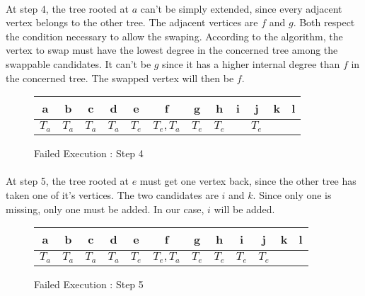 \paragraph{}
At step 4, the tree rooted at $a$ can't be simply extended, since every
adjacent vertex belongs to the other tree. The adjacent vertices are $f$ and
$g$. Both respect the condition necessary to allow the swaping. According to
the algorithm, the vertex to swap must have the lowest degree in the concerned
tree among the swappable candidates. It can't be $g$ since it has a higher
internal degree than $f$ in the concerned tree. The swapped vertex will then be
$f$.

\begin{figure}[H]
  \caption{Failed Execution : Step 4}
  \begin{center}
    \begin{tikzpicture}[scale=0.9,transform shape]
      
    \end{tikzpicture}
    \begin{tabular}{|c|c|c|c|c|c|c|c|c|c|c|c|}
\hline
a & b & c & d & e & f & g & h & i & j & k & l\\
\hline
$T_a$ & $T_a$ & $T_a$ & $T_a$ & $T_e$ & $T_e, T_a$ & $T_e$ & $T_e$ & & $T_e$ & &\\
\hline
    \end{tabular}
  \end{center}
\end{figure}

\paragraph{}
At step 5, the tree rooted at $e$ must get one vertex back, since the other
tree has taken one of it's vertices. The two candidates are $i$ and $k$. Since
only one is missing, only one must be added. In our case, $i$ will be added.

\begin{figure}[H]
  \caption{Failed Execution : Step 5}
  \begin{center}
    \begin{tikzpicture}[scale=0.9,transform shape]
      
    \end{tikzpicture}
    \begin{tabular}{|c|c|c|c|c|c|c|c|c|c|c|c|}
\hline
a & b & c & d & e & f & g & h & i & j & k & l\\
\hline
$T_a$ & $T_a$ & $T_a$ & $T_a$ & $T_e$ & $T_e, T_a$ & $T_e$ & $T_e$ & $T_e$ & $T_e$ & &\\
\hline
    \end{tabular}
  \end{center}
\end{figure}

